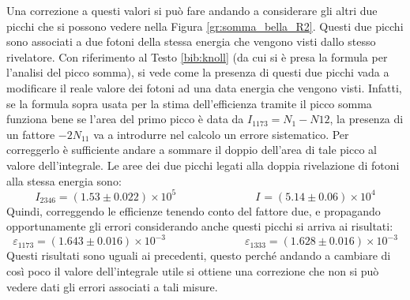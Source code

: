 Una correzione a questi valori si può fare andando a considerare gli altri due picchi che si possono vedere nella Figura \ref{gr:somma_bella_R2}. Questi due picchi sono
associati a due fotoni della stessa energia che vengono visti dallo stesso rivelatore. Con riferimento al Testo \ref{bib:knoll} (da cui si è presa la formula per l'analisi
del picco somma), si vede come la presenza di questi due picchi vada a modificare il reale valore dei fotoni ad una data energia che vengono visti. Infatti, se la formula
sopra usata per la stima dell'efficienza tramite il picco somma funziona bene se l'area del primo picco è data da $I_{1173}=N_{1}-N{12}$, la presenza di un fattore
$-2N_{11}$ va a introdurre nel calcolo un errore sistematico. Per correggerlo è sufficiente andare a sommare il doppio dell'area di tale picco al valore dell'integrale.
Le aree dei due picchi legati alla doppia rivelazione di fotoni alla stessa energia sono:
$$I_{2346} = (1.53\pm 0.022)\times 10^5 \hspace{3cm} I_{} = (5.14 \pm 0.06)\times 10^4 $$
Quindi, correggendo le efficienze tenendo conto del fattore due, e propagando opportunamente gli errori considerando anche questi picchi si arriva ai risultati:
$$\varepsilon_{1173}=(1.643 \pm 0.016)\times 10^{-3} \hspace{3cm} \varepsilon_{1333}=(1.628 \pm 0.016)\times 10^{-3}$$
Questi risultati sono uguali ai precedenti, questo perché andando a cambiare di così poco il valore dell'integrale utile si ottiene una correzione che non si può vedere dati
gli errori associati a tali misure.
